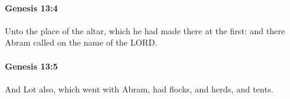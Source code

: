		\paragraph{Genesis 13:4} %
			\label{GENESIS-13-4}

			Unto the place of the altar, which he had made there at the first: and there Abram called on the name of the LORD.


		\paragraph{Genesis 13:5} %
			\label{GENESIS-13-5}

			And Lot also, which went with Abram, had flocks, and herds, and tents.


